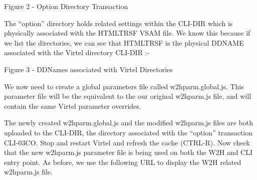 \documentclass[letterpaper,10pt,english]{sphinxmanual}
\begin{document}
Figure 2 - Option Directory Transaction

The “option” directory holds related settings within the CLI-DIR which is physically associated with the HTMLTRSF VSAM file. We know this because if we list the directories, we can see that HTMLTRSF is the physical DDNAME associated with the Virtel directory CLI-DIR :-

Figure 3 - DDNames associated with Virtel Directories

We now need to create a global parameters file called w2hparm.global.js. This parameter file will be the equivalent to the our original w2hparm.js file, and will contain the same Virtel parameter overrides.

\begin{sphinxVerbatim}[commandchars=\\\{\}]
  
     
   
\end{sphinxVerbatim}

The newly created w2hparm.global.js and the modified w2hparm.js files are both uploaded to the CLI-DIR, the directory associated with the “option” transaction CLI-03CO. Stop and restart Virtel and refresh the cache (CTRL-R). Now check that the new w2hparm.js parameter file is being used on both the W2H and CLI entry point. As before, we use the following URL to display the W2H related w2hparm.js file.
\end{document}
